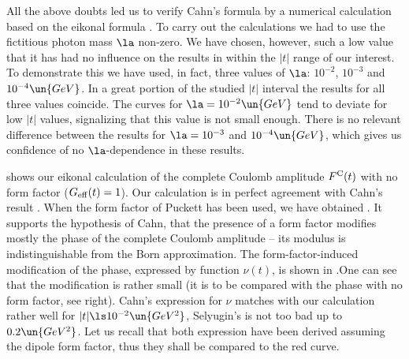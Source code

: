 All the above doubts led us to verify Cahn's formula by a numerical calculation based on the eikonal formula . To carry out the calculations we had to use the fictitious photon mass $\la$ non-zero. We have chosen, however, such a low value that it has had no influence on the results in within the $|t|$ range of our interest. To demonstrate this we have used, in fact, three values of $\la$: $10^{-2}$, $10^{-3}$ and $10^{-4}\un{GeV}$. In a great portion of the studied $|t|$ interval the results for all three values coincide. The curves for $\la = 10^{-2} \un{GeV}$ tend to deviate for low $|t|$ values, signalizing that this value is not small enough. There is no relevant difference between the results for $\la = 10^{-3}$ and $10^{-4}\un{GeV}$, which gives us confidence of no $\la$-dependence in these results.

 shows our eikonal calculation of the complete Coulomb amplitude $F^{\rm C}(t)$ with no form factor ($G_{\rm eff}(t) = 1$). Our calculation is in perfect agreement with Cahn's result . When the form factor of Puckett has been used, we have obtained . It supports the hypothesis of Cahn, that the presence of a form factor modifies mostly the phase of the complete Coulomb amplitude -- its modulus is indistinguishable from the Born approximation. The form-factor-induced modification of the phase, expressed by function $\nu(t)$, is shown in .One can see that the modification is rather small (it is to be compared with the phase with no form factor, see  right). Cahn's expression for $\nu$ matches with our calculation rather well for $|t| \ls 10^{-2}\un{GeV^2}$, Selyugin's is not too bad up to $0.2\un{GeV^2}$. Let us recall that both expression have been derived assuming the dipole form factor, thus they shall be compared to the red curve.


\bmfig
{}
%
\emfig

